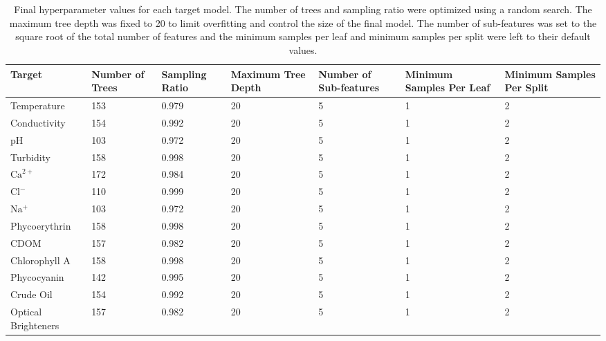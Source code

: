 \documentclass[remotesensing,article,submit,pdftex,moreauthors]{Definitions/mdpi}
\begin{document}
\section[\appendixname~\thesection]{}\label{Model Hyperparameters}
\begin{table}[H] 
\caption{Final hyperparameter values for each target model. The number of trees and sampling ratio were optimized using a random search. The maximum tree depth was fixed to 20 to limit overfitting and control the size of the final model. The number of sub-features was set to the square root of the total number of features and the minimum samples per leaf and minimum samples per split were left to their default values. \label{tab:hyperparameters}}
\begin{tabularx}{\textwidth}{CCCCCCC}
\toprule
\textbf{Target}	& \textbf{Number of Trees}	& \textbf{Sampling Ratio} & \textbf{Maximum Tree Depth} & \textbf{Number of Sub-features} & \textbf{Minimum Samples Per Leaf} & \textbf{Minimum Samples Per Split}\\
\midrule
Temperature & 153 & 0.979 & 20 & 5 & 1 & 2 \\
Conductivity & 154 & 0.992 & 20 & 5 & 1 & 2\\
pH & 103 & 0.972 & 20 & 5 & 1 & 2\\
Turbidity & 158 & 0.998 & 20 & 5 & 1 & 2\\
$\mathrm{Ca}^{2+}$ & 172 & 0.984 & 20 & 5 & 1 & 2\\
$\mathrm{Cl^-}$ & 110 & 0.999 & 20 & 5 & 1 & 2\\
$\mathrm{Na^+}$ & 103 & 0.972 & 20 & 5 & 1 & 2\\
Phycoerythrin & 158 & 0.998 & 20 & 5 & 1 & 2\\
CDOM & 157 & 0.982 & 20 & 5 & 1 & 2\\
Chlorophyll A & 158 & 0.998 & 20 & 5 & 1 & 2\\
Phycocyanin & 142 & 0.995 & 20 & 5 & 1 & 2\\
Crude Oil & 154 & 0.992 & 20 & 5 & 1 & 2\\
Optical Brighteners & 157 & 0.982 & 20 & 5 & 1 & 2\\
\bottomrule
\end{tabularx}
\end{table}
\end{document}
